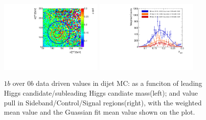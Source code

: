 \begin{figure}[htbp!]
\begin{center}
\includegraphics[width=0.45\textwidth,angle=-90]{figures/boosted/AppendixMuqcdstudy/QCD_OneTag_Incl_mH0H1.pdf}
\includegraphics[width=0.45\textwidth,angle=-90]{figures/boosted/AppendixMuqcdstudy/QCD_OneTag_Incl_mH0H1_pull.pdf}
\caption{$1b$ over $0b$ data driven \muqcd values in dijet MC: \muqcd as a funciton of leading Higgs candidate/subleading Higgs candiate mass(left); and \muqcd value pull in Sideband/Control/Signal regions(right), with the weighted mean value and the Guassian fit mean value shown on the plot.}
\label{fig:app-muqcd-1b-qcd}
\end{center}
\end{figure}

